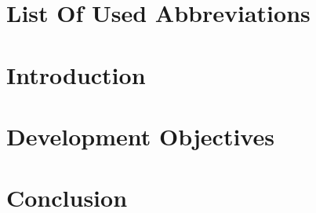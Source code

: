\documentclass[12pt, fleqn, a4paper]{article}
\begin{document}


\setlength\cftbeforesecskip{1pt}

\tableofcontents
\newpage

\section*{\centering List Of Used Abbreviations}
\begin{adjustwidth}{113pt}{43pt}
	\begin{sortedlist}
	\end{sortedlist}
\end{adjustwidth}
\section*{\centering Introduction}
\section{Development Objectives}
\section*{\centering Conclusion}

% 
\end{document}
